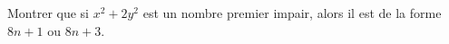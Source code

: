 Montrer que si $x^2 + 2y^2$ est un nombre premier impair, alors il est de la forme $8n + 1$ ou $8n + 3$.
